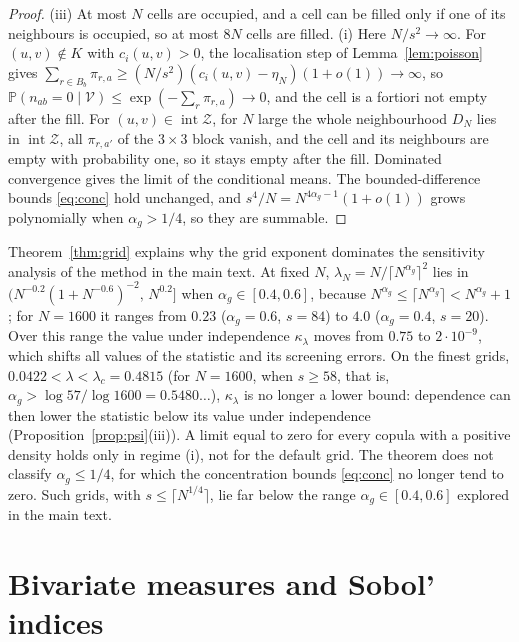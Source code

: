 \documentclass[11pt,a4paper]{article}
\theoremstyle{definition}
\theoremstyle{remark}
\newcommand{\Prob}{\mathbb{P}}
\newcommand{\cV}{\mathcal{V}}
\newcommand{\cZ}{\mathcal{Z}}
\begin{document}
\begin{proof}
(iii) At most $N$ cells are occupied, and a cell can be filled only if one of its neighbours is occupied, so at most $8N$ cells are filled. (i) Here $N/s^2\to\infty$. For $(u,v)\notin K$ with $c_i(u,v)>0$, the localisation step of Lemma~\ref{lem:poisson} gives $\sum_{r\in B_b}\pi_{r,a}\ge(N/s^2)(c_i(u,v)-\eta_N)(1+o(1))\to\infty$, so $\Prob(n_{ab}=0\mid\cV)\le\exp(-\sum_r\pi_{r,a})\to0$, and the cell is a fortiori not empty after the fill. For $(u,v)\in\operatorname{int}\cZ$, for $N$ large the whole neighbourhood $D_N$ lies in $\operatorname{int}\cZ$, all $\pi_{r,a'}$ of the $3\times3$ block vanish, and the cell and its neighbours are empty with probability one, so it stays empty after the fill. Dominated convergence gives the limit of the conditional means. The bounded-difference bounds \eqref{eq:conc} hold unchanged, and $s^4/N=N^{4\alpha_g-1}(1+o(1))$ grows polynomially when $\alpha_g>1/4$, so they are summable.
\end{proof}

Theorem~\ref{thm:grid} explains why the grid exponent dominates the sensitivity analysis of the method in the main text. At fixed $N$, $\lambda_N=N/\lceil N^{\alpha_g}\rceil^2$ lies in $\big(N^{-0.2}(1+N^{-0.6})^{-2},\,N^{0.2}\big]$ when $\alpha_g\in[0.4,0.6]$, because $N^{\alpha_g}\le\lceil N^{\alpha_g}\rceil<N^{\alpha_g}+1$; for $N=1600$ it ranges from $0.23$ ($\alpha_g=0.6$, $s=84$) to $4.0$ ($\alpha_g=0.4$, $s=20$). Over this range the value under independence $\kappa_\lambda$ moves from $0.75$ to $2\cdot10^{-9}$, which shifts all values of the statistic and its screening errors. On the finest grids, $0.0422<\lambda<\lambda_c=0.4815$ (for $N=1600$, when $s\ge58$, that is, $\alpha_g>\log57/\log1600=0.5480\ldots$), $\kappa_\lambda$ is no longer a lower bound: dependence can then lower the statistic below its value under independence (Proposition~\ref{prop:psi}(iii)). A limit equal to zero for every copula with a positive density holds only in regime (i), not for the default grid. The theorem does not classify $\alpha_g\le1/4$, for which the concentration bounds \eqref{eq:conc} no longer tend to zero. Such grids, with $s\le\lceil N^{1/4}\rceil$, lie far below the range $\alpha_g\in[0.4,0.6]$ explored in the main text.

\section{Bivariate measures and Sobol' indices}\label{sec:sobol}
\end{document}
